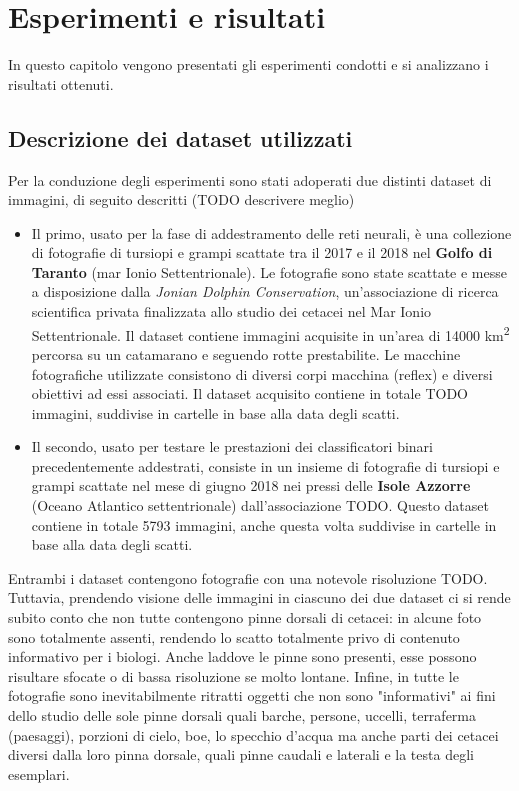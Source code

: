 \chapter{Esperimenti e risultati}\label{esperimenti}
In questo capitolo vengono presentati gli esperimenti condotti e si analizzano i risultati ottenuti.

\section{Descrizione dei dataset utilizzati}
\label{dataset}
Per la conduzione degli esperimenti sono stati adoperati due distinti dataset di immagini, di seguito descritti (TODO descrivere meglio)

\begin{itemize}
\item Il primo, usato per la fase di addestramento delle reti neurali, è una collezione di fotografie di tursiopi e grampi scattate tra il 2017 e il 2018 nel \textbf{Golfo di Taranto} (mar Ionio Settentrionale). Le fotografie sono state scattate e messe a disposizione dalla \textit{Jonian Dolphin Conservation}, un'associazione di ricerca scientifica privata finalizzata allo studio dei cetacei nel Mar Ionio Settentrionale. Il dataset contiene immagini acquisite in un'area di 14000 km\textsuperscript{2} percorsa su un catamarano e seguendo rotte prestabilite. Le macchine fotografiche utilizzate consistono di diversi corpi macchina (reflex) e diversi obiettivi ad essi associati.
Il dataset acquisito contiene in totale TODO immagini, suddivise in cartelle in base alla data degli scatti.
\item Il secondo, usato per testare le prestazioni dei classificatori binari precedentemente addestrati, consiste in un insieme di fotografie di tursiopi e grampi scattate nel mese di giugno 2018 nei pressi delle \textbf{Isole Azzorre} (Oceano Atlantico settentrionale) dall'associazione TODO.
Questo dataset contiene in totale 5793 immagini, anche questa volta suddivise in cartelle in base alla data degli scatti.
\end{itemize}

Entrambi i dataset contengono fotografie con una notevole risoluzione TODO. Tuttavia, prendendo visione delle immagini in ciascuno dei due dataset ci si rende subito conto che non tutte contengono pinne dorsali di cetacei: in alcune foto sono totalmente assenti, rendendo lo scatto totalmente privo di contenuto informativo per i biologi.
Anche laddove le pinne sono presenti, esse possono risultare sfocate o di bassa risoluzione se molto lontane. Infine, in tutte le fotografie sono inevitabilmente ritratti oggetti che non sono "informativi" ai fini dello studio delle sole pinne dorsali quali barche, persone, uccelli, terraferma (paesaggi), porzioni di cielo, boe, lo specchio d'acqua ma anche parti dei cetacei diversi dalla loro pinna dorsale, quali pinne caudali e laterali e la testa degli esemplari.

